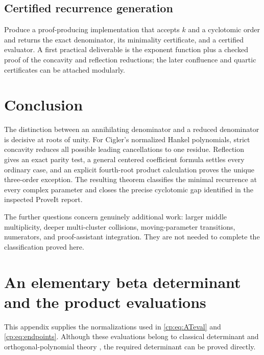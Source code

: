 \documentclass[11pt]{article}
\theoremstyle{definition}
\theoremstyle{remark}
\theoremstyle{definition}
\theoremstyle{plain}
\numberwithin{equation}{section}
\begin{document}
\subsection{Certified recurrence generation}
\label{cp:q:certified}
Produce a proof-producing implementation that accepts $k$ and a cyclotomic
order and returns the exact denominator, its minimality certificate, and
a certified evaluator. A first practical deliverable is the exponent
function plus a checked proof of the concavity and reflection reductions;
the later confluence and quartic certificates can be attached modularly.

\section{Conclusion}
The distinction between an annihilating denominator and a reduced denominator
is decisive at roots of unity. For Cigler's normalized Hankel polynomials,
strict concavity reduces all possible leading cancellations to one residue.
Reflection gives an exact parity test, a general centered coefficient formula
settles every ordinary case, and an explicit fourth-root product calculation
proves the unique three-order exception. The resulting theorem classifies
the minimal recurrence at every complex parameter and closes the precise
cyclotomic gap identified in the inspected ProveIt report.

The further questions concern genuinely additional work: larger middle
multiplicity, deeper multi-cluster collisions, moving-parameter transitions,
numerators, and proof-assistant integration. They are not needed to complete
the classification proved here.

\renewcommand{\thesection}{\Alph{section}}
\renewcommand{\theHsection}{cp.app.\Alph{section}}
\setcounter{section}{4}
\section{An elementary beta determinant and the product evaluations}
\label{cp:app:beta}
This appendix supplies the normalizations used in
\eqref{cp:eq:ATeval} and \eqref{cp:eq:endpoints}. Although these evaluations
belong to classical determinant and orthogonal-polynomial theory
\cite{Kratt}, the required determinant can be proved directly.
\end{document}
